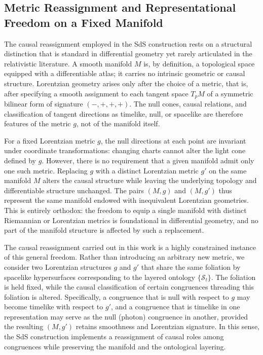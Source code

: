 \documentclass[11pt,a4paper]{article}
\theoremstyle{plain}
\theoremstyle{definition}
\theoremstyle{remark}
\begin{document}
\subsection{Metric Reassignment and Representational Freedom on a Fixed Manifold}\label{sec:reassignment}

The causal reassignment employed in the SdS construction rests on a structural distinction that is standard in differential geometry yet rarely articulated in the relativistic literature. A smooth manifold $M$ is, by definition, a topological space equipped with a differentiable atlas; it carries no intrinsic geometric or causal structure. Lorentzian geometry arises only after the choice of a metric, that is, after specifying a smooth assignment to each tangent space $T_pM$ of a symmetric bilinear form of signature $(-,+,+,+)$. The null cones, causal relations, and classification of tangent directions as timelike, null, or spacelike are therefore features of the metric $g$, not of the manifold itself.

For a fixed Lorentzian metric $g$, the null directions at each point are invariant under coordinate transformations: changing charts cannot alter the light cone defined by $g$. However, there is no requirement that a given manifold admit only one such metric. Replacing $g$ with a distinct Lorentzian metric $g'$ on the same manifold $M$ alters the causal structure while leaving the underlying topology and differentiable structure unchanged. The pairs $(M,g)$ and $(M,g')$ thus represent the same manifold endowed with inequivalent Lorentzian geometries. This is entirely orthodox: the freedom to equip a single manifold with distinct Riemannian or Lorentzian metrics is foundational in differential geometry, and no part of the manifold structure is affected by such a replacement.

The causal reassignment carried out in this work is a highly constrained instance of this general freedom. Rather than introducing an arbitrary new metric, we consider two Lorentzian structures $g$ and $g'$ that share the same foliation by spacelike hypersurfaces corresponding to the layered ontology $\{\mathcal{S}_t\}$. The foliation is held fixed, while the causal classification of certain congruences threading this foliation is altered. Specifically, a congruence that is null with respect to $g$ may become timelike with respect to $g'$, and a congruence that is timelike in one representation may serve as the null (photon) congruence in another, provided the resulting $(M,g')$ retains smoothness and Lorentzian signature. In this sense, the SdS construction implements a reassignment of causal roles among congruences while preserving the manifold and the ontological layering.
\end{document}
